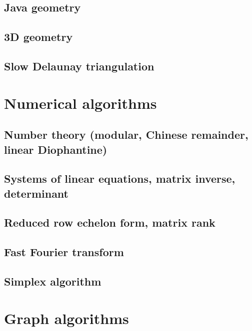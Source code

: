 \subsection{Java geometry}
\raggedbottom
\hrulefill
\subsection{3D geometry}
\raggedbottom
\hrulefill
\subsection{Slow Delaunay triangulation}
\raggedbottom

\section{Numerical algorithms}
\subsection{Number theory (modular, Chinese remainder, linear Diophantine)}
\raggedbottom
\hrulefill
\subsection{Systems of linear equations, matrix inverse, determinant}
\raggedbottom
\hrulefill
\subsection{Reduced row echelon form, matrix rank}
\raggedbottom
\hrulefill
\subsection{Fast Fourier transform}
\raggedbottom
\hrulefill
\subsection{Simplex algorithm}
\raggedbottom

\section{Graph algorithms}
